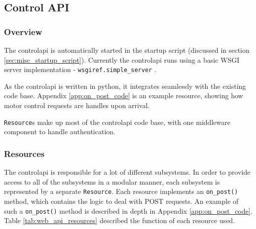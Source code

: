 \subsection{Control API}
\subsubsection{Overview}
The \gls{controlapi} is automatically started in the startup script (discussed in section \ref{sec:misc_startup_script}). Currently the \gls{controlapi} runs using a basic WSGI server implementation - \texttt{wsgiref.simple\_server} \cite{python-wsgiref-simple_server}.

As the \gls{controlapi} is written in \gls{python}, it integrates seamlessly with the existing code base. Appendix \ref{app:on_post_code} is an example resource, showing how motor control requests are handles upon arrival.

\texttt{Resource}s make up most of the \gls{controlapi} code base, with one middleware component to handle authentication.



\subsubsection{Resources}

The \gls{controlapi} is responsible for a lot of different subsystems. In order to provide access to all of the subsystems in a modular manner, each subsystem is represented by a separate \texttt{Resource}. Each resource implements an \texttt{on\_post()} \gls{method}, which contains the logic to deal with \gls{POST} requests. An example of such a \texttt{on\_post()} \gls{method} is described in depth in Appendix \ref{app:on_post_code}. Table \ref{tab:web_api_resources} described the function of each resource used.

